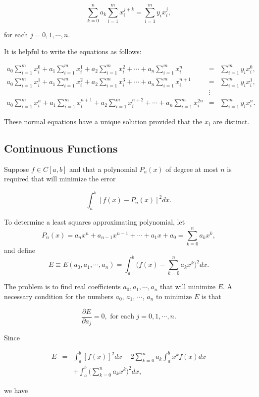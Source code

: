 \documentclass[preprint,12pt]{elsarticle}
\begin{document}
\[
\sum_{k=0}^n a_k\sum_{i=1}^mx_i^{j+k}=\sum_{i=1}^my_ix_i^j,
\]

for each $j=0,1,\cdots,n.$

It is helpful to write the equations as follows:

{\footnotesize
\begin{eqnarray*}
a_0\sum_{i=1}^{m}x_i^0+a_1\sum_{i=1}^{m}x_i^1+a_2\sum_{i=1}^{m}x_i^2+\cdots+a_n\sum_{i=1}^{m}x_i^n
&=& \sum_{i=1}^{m}y_ix_i^0, \\
a_0\sum_{i=1}^{m}x_i^1+a_1\sum_{i=1}^{m}x_i^2+a_2\sum_{i=1}^{m}x_i^3+\cdots+a_n\sum_{i=1}^{m}x_i^{n+1}
&=& \sum_{i=1}^{m}y_ix_i^1, \\
 &\vdots&  \\
a_0\sum_{i=1}^{m}x_i^n+a_1\sum_{i=1}^{m}x_i^{n+1}+a_2\sum_{i=1}^{m}x_i^{n+2}+\cdots+a_n\sum_{i=1}^{m}x_i^{2n}
&=& \sum_{i=1}^{m}y_ix_i^n.
\end{eqnarray*}
}

These normal equations have a unique solution provided that the $x_i$ are distinct.

\subsection{Continuous Functions}
\label{SS:2.2}

Suppose $f\in C[a, b]$ and that a polynomial $P_n(x)$ of degree at most $n$ is required that will minimize the error

\[
\int_a^b[f(x)-P_n(x)]^2dx.
\]

To determine a least squares approximating polynomial, let
$$
P_n(x)= a_nx^n + a_{n-1}x^{n-1}+\cdots + a_1x + a_0 =\sum_{k=0}^n a_k x^k,
$$
and define
$$
E \equiv E(a_0,a_1,\cdots,a_n) =\int_a^b\biggl(f(x)-\sum_{k=0}^n a_k
x^k\biggr)^2dx.
$$

The problem is to find real coefficients $a_0,a_1,\cdots,a_n$ that will minimize $E$. A necessary condition for the numbers $a_0$, $a_1$, $\cdots$, $a_n$ to minimize $E$ is that

\[
\frac{\partial E}{\partial a_j}=0, \text{ for each } j=0,1,\cdots,n.
\]

Since

\begin{eqnarray*}
 E &=&\int_a^b[f(x)]^2dx-2\sum_{k=0}^na_k\int_a^bx^kf(x)dx \\
 &&+ \int_a^b \biggl( \sum_{k=0}^na_kx^k \biggr)^2dx,
\end{eqnarray*}

we have
\end{document}
